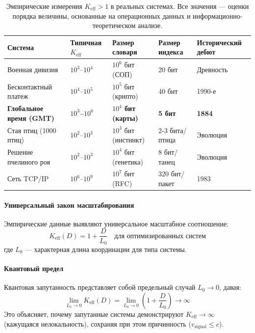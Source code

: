 \documentclass[11pt,a4paper]{article}
\begin{document}
	\begin{table}[htbp]
		\centering
		\small
		\begin{tabular}{p{}p{}p{}p{}p{}}
			\toprule
			\textbf{Система} & \textbf{Типичная $K_{\mathrm{eff}}$} & \textbf{Размер словаря} & \textbf{Размер индекса} & \textbf{Исторический дебют} \\
			\midrule
			Военная дивизия & $10^3$--$10^4$ & $10^6$ бит (СОП) & 20 бит & Древность \\
			Бесконтактный платеж & $10^4$--$10^5$ & $10^5$ бит (крипто) & 40 бит & 1990-е \\
			\textbf{Глобальное время (GMT)} & \textbf{$10^3$--$10^6$} & \textbf{$10^4$ бит (карты)} & \textbf{5 бит} & \textbf{1884} \\
			Стая птиц (1000 птиц) & $10^2$--$10^3$ & $10^3$ бит (инстинкт) & 2-3 бита/птица & Эволюция \\
			Решение пчелиного роя & $10^2$--$10^3$ & $10^4$ бит (генетика) & 8 бит/танец & Эволюция \\
			Сеть TCP/IP & $10^6$--$10^9$ & $10^7$ бит (RFC) & 320 бит/пакет & 1983 \\
			\bottomrule
		\end{tabular}
		\caption{Эмпирические измерения $K_{\mathrm{eff}} > 1$ в реальных системах. Все значения — оценки порядка величины, основанные на операционных данных и информационно-теоретическом анализе.}
		\label{tab:empirical-keff}
	\end{table}
	
	\paragraph{Универсальный закон масштабирования}
	Эмпирические данные выявляют универсальное масштабное соотношение:
	\begin{equation}
		\boxed{K_{\mathrm{eff}}(D) = 1 + \frac{D}{L_0} \quad \text{для оптимизированных систем}}
	\end{equation}
	где $L_0$ — характерная длина координации для типа системы.
	
	\paragraph{Квантовый предел}
	Квантовая запутанность представляет собой предельный случай $L_0 \to 0$, давая:
	\begin{equation}
		\lim_{L_0 \to 0} K_{\mathrm{eff}}(D) = \lim_{L_0 \to 0} \left(1 + \frac{D}{L_0}\right) \to \infty
	\end{equation}
	Это объясняет, почему запутанные системы демонстрируют $K_{\mathrm{eff}} \to \infty$ 
	(кажущаяся нелокальность), сохраняя при этом причинность ($v_{\text{signal}} \leq c$).
	
\end{document}
